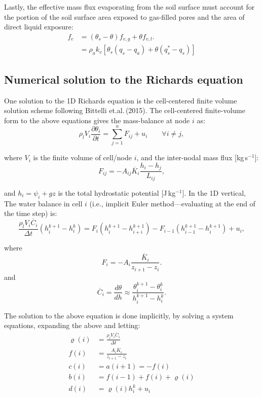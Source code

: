 \documentclass[10pt, letterpapr]{article}
\begin{document}
Lastly, the effective mass flux evaporating from the soil surface must account for the portion of the soil surface area exposed to gas-filled pores and the area of direct liquid exposure:
\begin{align*}
	f_e &=\left(\theta_s-\theta\right)f_{v,g}+\theta f_{v,l}. \\
		&=\rho_ak_v\left[\theta_s(q_s-q_a)+\theta(q^*_s-q_s)\right]
\end{align*}




\subsection*{Numerical solution to the Richards equation}

One solution to the 1D Richards equation is the cell-centered finite volume solution scheme following Bittelli et.al.\,(2015). The cell-centered finite-volume form to the above equations gives the mass-balance at node $i$ as:
\[
	\rho_lV_i\frac{\partial\theta_i}{\partial t}=\sum_{j=1}^{n}F_{ij}+u_i \qquad\forall i\neq j,
\]

\noindent where $V_i$ is the finite volume of cell/node $i$, and the inter-nodal mass flux [kg\,s$^{-1}$]:
\[
	F_{ij}=-A_{ij}\overline{K}_i\frac{h_i-h_j}{L_{ij}},
\]

\noindent and $h_i=\psi_i+gz$ is the total hydrostatic potential [J\,kg$^{-1}$]. In the 1D vertical, The water balance in cell $i$ (i.e., implicit Euler method---evaluating at the end of the time step) is: %
\[
	\frac{\rho_lV_i\overline{C}_i}{\Delta t}\left(h_i^{k+1}-h_i^k\right)=F_i\left(h_i^{k+1}-h_{i+i}^{k+1}\right)-F_{i-1}\left(h_{i-1}^{k+1}-h_i^{k+1}\right)+u_i,
\]

\noindent where
\[
	F_i=-A_i\frac{\overline{K}_i}{z_{i+1}-z_i}.
\]
\noindent and
\[
	\overline{C}_i=\frac{d\theta}{dh}\approx\frac{\theta_i^{k+1}-\theta_i^k}{h_i^{k+1}-h_i^k}.
\]

The solution to the above equation is done implicitly, by solving a system equations, expanding the above and letting:
\begin{align*}
	\varrho(i) &=\frac{\rho_l V_i\overline{C}_i}{\Delta t} \\
	f(i) &=\frac{A_i\overline{K}_i}{z_{i+1}-z_i} \\
	c(i) &= a(i+1) = -f(i) \\
	b(i) &= f(i-1)+f(i)+\varrho(i) \\
	d(i) &= \varrho(i)h_i^k+u_i
\end{align*}
\end{document}
